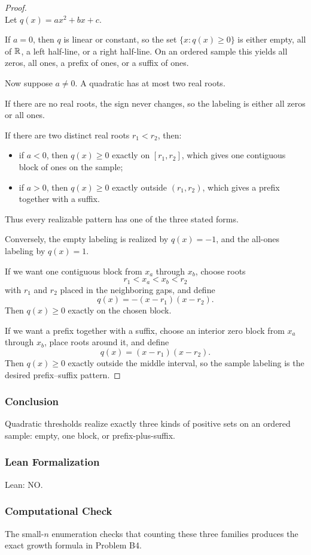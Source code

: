\documentclass{article}
\begin{document}
\begin{solutionbox}
\begin{proof}
\leavevmode\\
Let \(q(x)=a x^2+b x+c\).

If \(a=0\), then \(q\) is linear or constant, so the set \(\{x:q(x)\ge 0\}\) is
either empty, all of \(\mathbb{R}\), a left half-line, or a right half-line. On an
ordered sample this yields all zeros, all ones, a prefix of ones, or a suffix
of ones.

Now suppose \(a\neq 0\). A quadratic has at most two real roots.

If there are no real roots, the sign never changes, so the labeling is either
all zeros or all ones.

If there are two distinct real roots \(r_1<r_2\), then:
\begin{itemize}[leftmargin=2.5em]
    \item if \(a<0\), then \(q(x)\ge 0\) exactly on \([r_1,r_2]\), which gives
    one contiguous block of ones on the sample;
    \item if \(a>0\), then \(q(x)\ge 0\) exactly outside \((r_1,r_2)\), which
    gives a prefix together with a suffix.
\end{itemize}

Thus every realizable pattern has one of the three stated forms.

Conversely, the empty labeling is realized by \(q(x)=-1\), and the all-ones
labeling by \(q(x)=1\).

If we want one contiguous block from \(x_a\) through \(x_b\), choose roots
\[
r_1<x_a<x_b<r_2
\]
with \(r_1\) and \(r_2\) placed in the neighboring gaps, and define
\[
q(x)=-(x-r_1)(x-r_2).
\]
Then \(q(x)\ge 0\) exactly on the chosen block.

If we want a prefix together with a suffix, choose an interior zero block from
\(x_a\) through \(x_b\), place roots around it, and define
\[
q(x)=(x-r_1)(x-r_2).
\]
Then \(q(x)\ge 0\) exactly outside the middle interval, so the sample labeling
is the desired prefix--suffix pattern.
\end{proof}

\subsubsection{Conclusion}

Quadratic thresholds realize exactly three kinds of positive sets on an ordered
sample: empty, one block, or prefix-plus-suffix.

\subsubsection{Lean Formalization}

Lean: NO.

\subsubsection{Computational Check}

The small-\(n\) enumeration checks that counting these three families produces
the exact growth formula in Problem B4.

\end{solutionbox}
\end{document}
